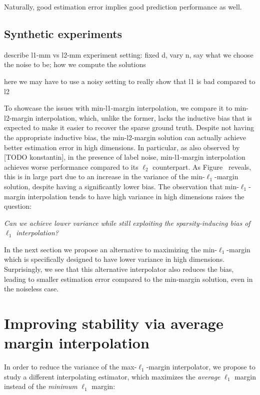Naturally, good estimation error implies good prediction performance as well.

\subsection{Synthetic experiments}

describe l1-mm vs l2-mm experiment setting: fixed d, vary n, say what we choose
the noise to be; how we compute the solutions

here we may have to use a noisy setting to really show that l1 is bad compared
to l2

To showcase the issues with min-l1-margin interpolation, we compare it to
min-l2-margin interpolation, which, unlike the former, lacks the inductive bias
that is expected to make it easier to recover the sparse ground truth. Despite
not having the appropriate inductive bias, the min-l2-margin solution can
actually achieve better estimation error in high dimensions. In particular, as
also observed by [TODO konstantin], in the presence of label noise,
min-l1-margin interpolation achieves worse performance compared to its $\ell_2$
counterpart.  As Figure~ reveals, this is in large part due to an
increase in the variance of the min-$\ell_1$-margin solution, despite having a
significantly lower bias. The observation that min-$\ell_1$-margin interpolation
tends to have high variance in high dimensions raises the question:

\begin{center}

\emph{Can we achieve lower variance while still exploiting the sparsity-inducing
bias of $\ell_1$ interpolation?}

\end{center}

In the next section we propose an alternative to maximizing the
min-$\ell_1$-margin which is specifically designed to have lower variance in
high dimensions.  Surprisingly, we see that this alternative interpolator also
reduces the bias, leading to smaller estimation error compared to the min-margin
solution, even in the noiseless case.


\section{Improving stability via average margin interpolation}

In order to reduce the variance of the max-$\ell_1$-margin interpolator, we
propose to study a different interpolating estimator, which maximizes the
\emph{average} $\ell_1$ margin instead of the \emph{minimum} $\ell_1$ margin:

